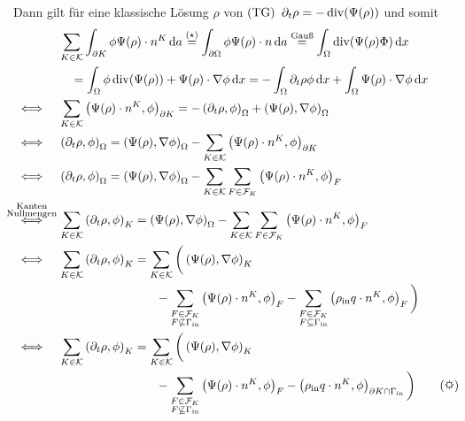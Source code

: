 Dann gilt für eine klassische Lösung $ \rho $ von $ \operatorname{(TG)} $  $ \partial_t \rho = - \operatorname{div}(\Psi(\rho)) $ und somit
\begin{align*}
	&&&\sum_{K \in \mathcal{K}} \int_{\partial K} \phi \Psi(\rho) \cdot n^K \diff a \stackrel{(\star)}{=} \int_{\partial \Omega} \phi \Psi(\rho) \cdot n \diff a \stackrel{\text{Gauß}}{=} \int_{\Omega} \dive(\Psi(\rho) \Phi) \diff x \\
	&&& \quad = \int_{\Omega} \phi \dive(\Psi(\rho)) + \Psi(\rho) \cdot \nabla \phi \diff x = - \int_\Omega \partial_t \rho \phi \diff x + \int_\Omega \Psi(\rho) \cdot \nabla \phi \diff x \\
	&\iff &&\sum_{K \in \mathcal{K}} \left(\Psi(\rho) \cdot n^K, \phi \right)_{\partial K} = - \left(\partial_t \rho, \phi  \right)_\Omega + \left(\Psi(\rho), \nabla\phi  \right)_\Omega \\
	&\iff && \left(\partial_t \rho, \phi  \right)_\Omega  =  \left(\Psi(\rho), \nabla\phi  \right)_\Omega - \sum_{K \in \mathcal{K} } \left(\Psi(\rho) \cdot n^K, \phi \right)_{\partial K} \\
	&\iff &&\left(\partial_t \rho, \phi  \right)_\Omega  =  \left(\Psi(\rho), \nabla \phi  \right)_\Omega - \sum_{K \in \mathcal{K}} \sum_{F \in \mathcal{F}_K} \left(\Psi(\rho) \cdot n^K, \phi \right)_{F} \\
	&\stackrel{\mathclap{\substack{\text{Kanten} \\ \text{Nullmengen}}}}{\iff} &&\sum_{K \in \mathcal{K}} \left(\partial_t \rho, \phi  \right)_K  =  \left(\Psi(\rho), \nabla \phi  \right)_\Omega - \sum_{K \in \mathcal{K}} \sum_{F \in \mathcal{F}_K} \left(\Psi(\rho) \cdot n^K, \phi \right)_{F} \\
	&\iff  &&\sum_{K \in \mathcal{K}} \left(\partial_t \rho, \phi  \right)_K  = \sum_{K \in \mathcal{K}} \bigg(  \left(\Psi(\rho), \nabla \phi \right)_K\\
	&&&\qquad\qquad\qquad\qquad -\sum_{\substack{F \in \mathcal{F}_K \\ F \not\subseteq \Gammain}} \left(\Psi(\rho) \cdot n^K, \phi \right)_{F}- \sum_{\substack{F \in \mathcal{F}_K \\ F \subseteq \Gammain}} \left(\rhoin q \cdot n^K, \phi \right)_{F} \bigg)\\
	&\iff  &&\sum_{K \in \mathcal{K}} \left(\partial_t \rho, \phi  \right)_K  = \sum_{K \in \mathcal{K}} \bigg( \left(\Psi(\rho), \nabla\phi \right)_K \\
	&&& \qquad\qquad\qquad\qquad -\sum_{\substack{F \in \mathcal{F}_K \\ F \not\subseteq \Gammain}} \left(\Psi(\rho) \cdot n^K, \phi \right)_{F} - \left(\rhoin q \cdot n^K, \phi \right)_{\partial K \cap \Gammain} \bigg) \tag{\sun}
\end{align*}
